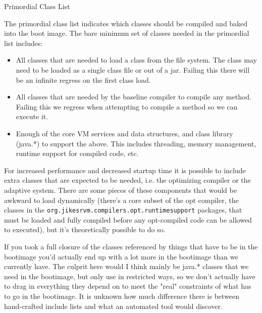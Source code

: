 \begin{section}{Primordial Class List}
\label{sec:primordialclasslist}

The primordial class list indicates which classes should be compiled and baked into the boot image. The bare minimum set of classes needed in the primordial list includes:

\begin{itemize}
  \item All classes that are needed to load a class from the file system. The class may need to be loaded as a single class file or out of a jar. Failing this there will be an infinite regress on the first class load.
  \item All classes that are needed by the baseline compiler to compile any method. Failing this we regress when attempting to compile a method so we can execute it.
  \item Enough of the core VM services and data structures, and class library (java.*) to support the above. This includes threading, memory management, runtime support for compiled code, etc.
\end{itemize}

For increased performance and decreased startup time it is possible to include extra classes that are expected to be needed, i.e. the optimizing compiler or the adaptive system. There are some pieces of these components that would be awkward to load dynamically (there's a core subset of the opt compiler, the classes in the \verb+org.jikesrvm.compilers.opt.runtimesupport+ packages, that must be loaded and fully compiled before any opt-compiled code can be allowed to executed), but it's theoretically possible to do so.

If you took a full closure of the classes referenced by things that have to be in the bootimage you'd actually end up with a lot more in the bootimage than we currently have. The culprit here would I think mainly be java.* classes that we need in the bootimage, but only use in restricted ways, so we don't actually have to drag in everything they depend on to meet the "real" constraints of what has to go in the bootimage. It is unknown how much difference there is between hand-crafted include lists and what an automated tool would discover.

\end{section}

